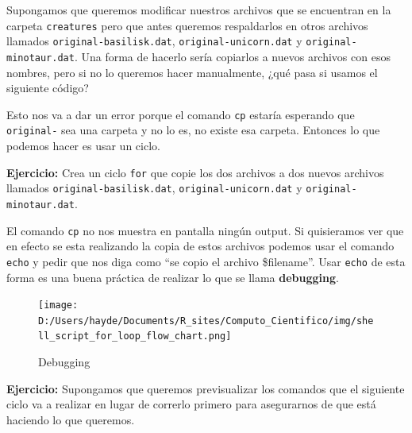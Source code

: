 \documentclass[
]{book}
\newenvironment{Shaded}{\begin{snugshade}}{\end{snugshade}}
\newcommand{\ExtensionTok}[1]{#1}
\newcommand{\FunctionTok}[1]{\textcolor[rgb]{0.13,0.29,0.53}{\textbf{#1}}}
\newcommand{\NormalTok}[1]{#1}
\newcommand{\OperatorTok}[1]{\textcolor[rgb]{0.81,0.36,0.00}{\textbf{#1}}}
\newcommand{\PreprocessorTok}[1]{\textcolor[rgb]{0.56,0.35,0.01}{\textit{#1}}}
\newcommand{\VariableTok}[1]{\textcolor[rgb]{0.00,0.00,0.00}{#1}}
\begin{document}
Supongamos que queremos modificar nuestros archivos que se encuentran en la carpeta \texttt{creatures} pero que antes queremos respaldarlos en otros archivos llamados \texttt{original-basilisk.dat}, \texttt{original-unicorn.dat} y \texttt{original-minotaur.dat}. Una forma de hacerlo sería copiarlos a nuevos archivos con esos nombres, pero si no lo queremos hacer manualmente, ¿qué pasa si usamos el siguiente código?

\begin{Shaded}
\end{Shaded}

Esto nos va a dar un error porque el comando \texttt{cp} estaría esperando que \texttt{original-} sea una carpeta y no lo es, no existe esa carpeta. Entonces lo que podemos hacer es usar un ciclo.

\textbf{Ejercicio:} Crea un ciclo \texttt{for} que copie los dos archivos a dos nuevos archivos llamados \texttt{original-basilisk.dat}, \texttt{original-unicorn.dat} y \texttt{original-minotaur.dat}.

El comando \texttt{cp} no nos muestra en pantalla ningún output. Si quisieramos ver que en efecto se esta realizando la copia de estos archivos podemos usar el comando \texttt{echo} y pedir que nos diga como ``se copio el archivo \$filename''. Usar \texttt{echo} de esta forma es una buena práctica de realizar lo que se llama \textbf{debugging}.

\begin{Shaded}
\end{Shaded}

\begin{figure}
\centering
\texttt{[image: D:/Users/hayde/Documents/R\_sites/Computo\_Cientifico/img/shell\_script\_for\_loop\_flow\_chart.png]}
\caption{Debugging}
\end{figure}

\textbf{Ejercicio:} Supongamos que queremos previsualizar los comandos que el siguiente ciclo va a realizar en lugar de correrlo primero para asegurarnos de que está haciendo lo que queremos.
\end{document}

